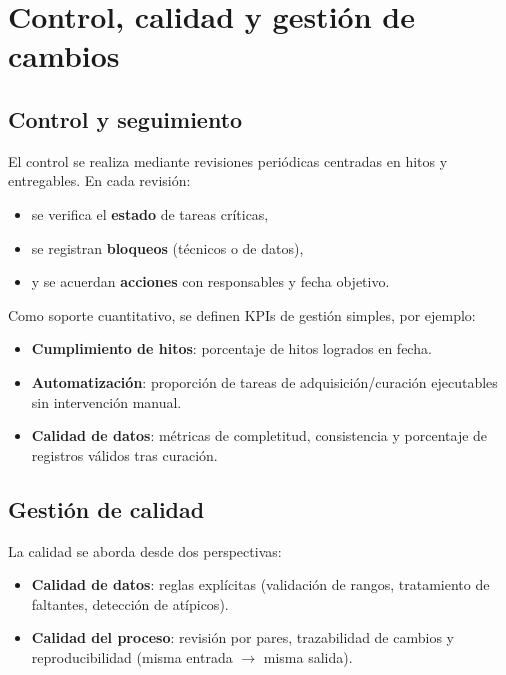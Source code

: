 \section{Control, calidad y gestión de cambios}\label{sec:control-calidad-y-gestion-de-cambios}

\subsection{Control y seguimiento}\label{subsec:control-y-seguimiento}

El control se realiza mediante revisiones periódicas centradas en hitos y entregables. En cada revisión:
\begin{itemize}
    \item se verifica el \textbf{estado} de tareas críticas,
    \item se registran \textbf{bloqueos} (técnicos o de datos),
    \item y se acuerdan \textbf{acciones} con responsables y fecha objetivo.
\end{itemize}

Como soporte cuantitativo, se definen KPIs de gestión simples, por ejemplo:
\begin{itemize}
    \item \textbf{Cumplimiento de hitos}: porcentaje de hitos logrados en fecha.
    \item \textbf{Automatización}: proporción de tareas de adquisición/curación ejecutables sin intervención manual.
    \item \textbf{Calidad de datos}: métricas de completitud, consistencia y porcentaje de registros válidos tras curación.
\end{itemize}

\subsection{Gestión de calidad}\label{subsec:gestion-de-calidad}

La calidad se aborda desde dos perspectivas:
\begin{itemize}
    \item \textbf{Calidad de datos}: reglas explícitas (validación de rangos, tratamiento de faltantes, detección de atípicos).
    \item \textbf{Calidad del proceso}: revisión por pares, trazabilidad de cambios y reproducibilidad (misma entrada $\rightarrow$ misma salida).
\end{itemize}

